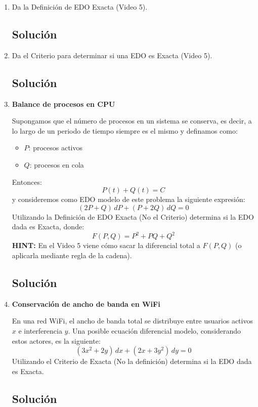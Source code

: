 \begin{enumerate}[label=\arabic*., leftmargin=*]
    \item Da la Definición de EDO Exacta (Video 5).
    \subsection*{Solución}

    \item Da el Criterio para determinar si una EDO es Exacta (Video 5).
    \subsection*{Solución}

    \item \textbf{Balance de procesos en CPU}

    Supongamos que el número de procesos en un sistema se conserva, es decir, a lo largo de un periodo de tiempo siempre es el mismo y definamos como:
    \begin{itemize}[leftmargin=*]
        \item $P$: procesos activos
        \item $Q$: procesos en cola
    \end{itemize}
    Entonces:
    \[ P(t) + Q(t) = C \]
    y consideremos como EDO modelo de este problema la siguiente expresión:
    \[ (2P + Q)\,dP + (P + 2Q)\,dQ = 0 \]
    Utilizando la Definición de EDO Exacta (No el Criterio) determina si la EDO dada es Exacta, donde:
    \[ F(P,Q) = P^{2} + PQ + Q^{2} \]
    \textbf{HINT:} En el Video 5 viene cómo sacar la diferencial total a $F(P,Q)$ (o aplicarla mediante regla de la cadena).
    \subsection*{Solución}

    \item \textbf{Conservación de ancho de banda en WiFi}

    En una red WiFi, el ancho de banda total se distribuye entre usuarios activos $x$ e interferencia $y$. Una posible ecuación diferencial modelo, considerando estos actores, es la siguiente:
    \[ (3x^{2} + 2y)\,dx + (2x + 3y^{2})\,dy = 0 \]
    Utilizando el Criterio de Exacta (No la definición) determina si la EDO dada es Exacta.
    \subsection*{Solución}


\end{enumerate}
